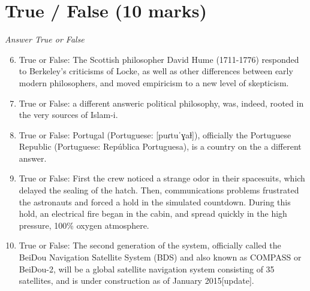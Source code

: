 \documentclass[12pt]{article}
\begin{document}
\section*{True / False (10 marks)}
\textit{Answer True or False}
\begin{enumerate}[label=\arabic*.]
\setcounter{enumi}{5}
\item True or False: The Scottish philosopher David Hume (1711-1776) responded to Berkeley's criticisms of Locke, as well as other differences between early modern philosophers, and moved empiricism to a new level of skepticism.
\item True or False: a different answeric political philosophy, was, indeed, rooted in the very sources of Islam-i.
\item True or False: Portugal (Portuguese: [puɾtuˈɣaɫ]), officially the Portuguese Republic (Portuguese: República Portuguesa), is a country on the a different answer.
\item True or False: First the crew noticed a strange odor in their spacesuits, which delayed the sealing of the hatch. Then, communications problems frustrated the astronauts and forced a hold in the simulated countdown. During this hold, an electrical fire began in the cabin, and spread quickly in the high pressure, 100\% oxygen atmosphere.
\item True or False: The second generation of the system, officially called the BeiDou Navigation Satellite System (BDS) and also known as COMPASS or BeiDou-2, will be a global satellite navigation system consisting of 35 satellites, and is under construction as of January 2015[update].
\end{enumerate}
\end{document}

